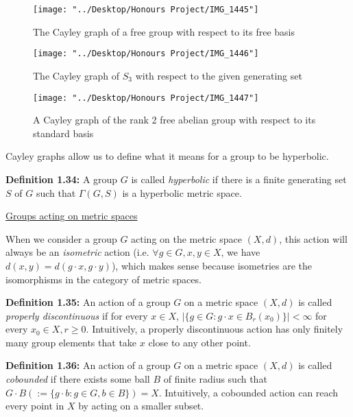 \documentclass[12pt]{article}
\newcommand{\vs}{\vskip10pt}
\begin{document}
\begin{figure} [H]
	\centering
	\texttt{[image: "../Desktop/Honours Project/IMG\_1445"]}
	\caption{The Cayley graph of a free group with respect to its free basis}
	\label{fig:img1445}
\end{figure}
	\vs 
\begin{figure} [H]
	\centering
	\texttt{[image: "../Desktop/Honours Project/IMG\_1446"]}
	\caption{The Cayley graph of $S_3$ with respect to the given generating set}
	\label{fig:img1446}
\end{figure}
	
\begin{figure} [H]
	\centering
	\texttt{[image: "../Desktop/Honours Project/IMG\_1447"]}
	\caption{A Cayley graph of the rank 2 free abelian group with respect to its standard basis}
	\label{fig:img1447}
\end{figure}
	Cayley graphs allow us to define what it means for a group to be hyperbolic. 
	
	\vs 
	
	\textbf{Definition 1.34: } A group $G$ is called \textit{hyperbolic} if there is a finite generating set $S$ of $G$ such that $\Gamma(G, S)$ is a hyperbolic metric space. 
	
	\vs
	
	\underline{Groups acting on metric spaces}
	
	\vs 
	
	When we consider a group $G$ acting on the metric space $(X,d)$, this action will always be an \textit{isometric} action (i.e. $\forall g \in G, x,y \in X$, we have $d(x, y) = d(g \cdot x, g \cdot y)$), which makes sense because isometries are the isomorphisms in the category of metric spaces. 
	
	\vs 
	
	\textbf{Definition 1.35: } An action of a group $G$ on a metric space $(X,d)$ is called \textit{properly discontinuous} if for every $x \in X$, $\vert \{g \in G: g \cdot x \in B_r(x_0)\}\vert < \infty$ for every $x_0 \in X, r \geq 0$. Intuitively, a properly discontinuous action has only finitely many group elements that take $x$ close to any other point. 
	
	\vs 
	
	\textbf{Definition 1.36: } An action of a group $G$ on a metric space $(X,d)$ is called \textit{cobounded} if there exists some ball $B$ of finite radius such that $G\cdot B (:= \{g \cdot b: g \in G, b \in B\}) = X$. Intuitively, a cobounded action can reach every point in $X$ by acting on a smaller subset. 
	
\end{document}
